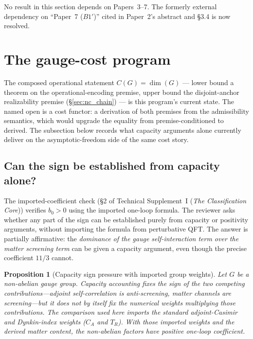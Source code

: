 \documentclass[11pt]{article}
\newtheorem{proposition}[theorem]{Proposition}
\theoremstyle{definition}
\newcommand{\TSI}{Technical Supplement~I (\emph{The Classification Core})}
\begin{document}
\smallskip\noindent No result in this section depends on Papers~3--7.
The formerly external dependency on ``Paper~7 ($B1'$)'' cited in
Paper~2's abstract and §3.4 is now resolved.


\newpage



\section{The gauge-cost program}
\label{sec:cost_program}

The composed operational statement $C(G) = \dim(G)$ --- lower bound a
theorem on the operational-encoding premise, upper bound the
disjoint-anchor realizability premise (\S\ref{sec:nc_chain}) --- is
this program's current state.  The named open is a cost functor: a
derivation of both premises from the admissibility semantics, which
would upgrade the equality from premise-conditioned to derived.  The
subsection below records what capacity arguments alone currently
deliver on the asymptotic-freedom side of the same cost story.

\subsection{Can the sign be established from capacity alone?}
\label{sec:AF_from_capacity}

The imported-coefficient check (\S2 of \TSI{}) verifies $b_0 > 0$
using the imported one-loop formula.  The reviewer asks whether any part of the sign can
be established purely from capacity or positivity arguments, without
importing the formula from perturbative QFT.  The answer is partially
affirmative: the \emph{dominance of the gauge self-interaction term
over the matter screening term} can be given a capacity argument,
even though the precise coefficient $11/3$ cannot.

\begin{proposition}[Capacity sign pressure with imported group weights]%
\label{prop:AF_capacity_bound}
Let $G$ be a non-abelian gauge group.  Capacity accounting fixes the sign
of the two competing contributions---adjoint self-correlation is
anti-screening, matter channels are screening---but it does not by itself
fix the numerical weights multiplying those contributions.  The comparison
used here imports the standard adjoint-Casimir and Dynkin-index weights
($C_A$ and $T_R$).  With those imported weights and the derived matter
content, the non-abelian factors have positive one-loop coefficient.
\end{proposition}
\end{document}
